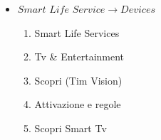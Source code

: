 \documentclass{article}
\begin{document}
\begin{itemize}
		\item $Smart$ $Life$ $Service \rightarrow Devices$
		\begin{enumerate}
			\item Smart Life Services
			\item Tv \& Entertainment
			\item Scopri (Tim Vision)
			\item Attivazione e regole
			\item Scopri Smart Tv
		\end{enumerate}
	\end{itemize}

	\addtocounter{section}{1}

		
		

		
		
		
	
	
\end{document}
